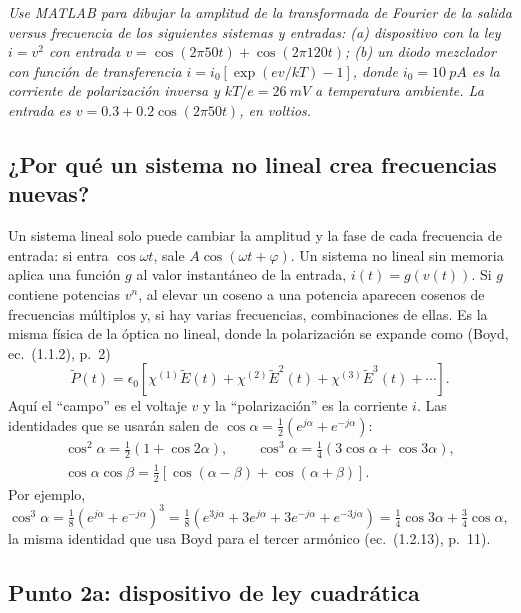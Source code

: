 \documentclass{article}
\begin{document}
\emph{Use MATLAB para dibujar la amplitud de la transformada de Fourier de la salida versus
frecuencia de los siguientes sistemas y entradas: (a) dispositivo con la ley $i=v^2$ con entrada
$v=\cos(2\pi50t)+\cos(2\pi120t)$; (b) un diodo mezclador con función de transferencia
$i=i_0[\exp(ev/kT)-1]$, donde $i_0=\SI{10}{pA}$ es la corriente de polarización inversa y
$kT/e=\SI{26}{mV}$ a temperatura ambiente. La entrada es $v=0.3+0.2\cos(2\pi50t)$, en voltios.}

\subsection*{¿Por qué un sistema no lineal crea frecuencias nuevas?}

Un sistema lineal solo puede cambiar la amplitud y la fase de cada frecuencia de entrada: si entra
$\cos\omega t$, sale $A\cos(\omega t+\varphi)$. Un sistema no lineal sin memoria aplica una función
$g$ al valor instantáneo de la entrada, $i(t)=g(v(t))$. Si $g$ contiene potencias $v^n$, al elevar un
coseno a una potencia aparecen cosenos de frecuencias múltiplos y, si hay varias frecuencias,
combinaciones de ellas. Es la misma física de la óptica no lineal, donde la polarización se expande
como (Boyd, ec.~(1.1.2), p.~2)
\[
\tilde P(t)=\epsilon_0\left[\chi^{(1)}\tilde E(t)+\chi^{(2)}\tilde E^2(t)+\chi^{(3)}\tilde E^3(t)+\cdots\right].
\]
Aquí el ``campo'' es el voltaje $v$ y la ``polarización'' es la corriente $i$. Las identidades que
se usarán salen de $\cos\alpha=\tfrac12(e^{j\alpha}+e^{-j\alpha})$:
\begin{gather*}
\cos^2\alpha=\tfrac12(1+\cos2\alpha),\qquad
\cos^3\alpha=\tfrac14(3\cos\alpha+\cos3\alpha),\\
\cos\alpha\cos\beta=\tfrac12[\cos(\alpha-\beta)+\cos(\alpha+\beta)].
\end{gather*}
Por ejemplo, $\cos^3\alpha=\tfrac18(e^{j\alpha}+e^{-j\alpha})^3
=\tfrac18(e^{3j\alpha}+3e^{j\alpha}+3e^{-j\alpha}+e^{-3j\alpha})=\tfrac14\cos3\alpha+\tfrac34\cos\alpha$,
la misma identidad que usa Boyd para el tercer armónico (ec.~(1.2.13), p.~11).

\subsection{Punto 2a: dispositivo de ley cuadrática}
\end{document}
